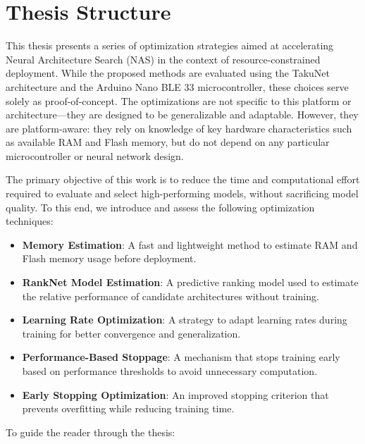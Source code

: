 \chapter{Thesis Structure}
\label{chap:ThesisStructure}


This thesis presents a series of optimization strategies aimed at accelerating Neural Architecture Search (NAS) in the context of resource-constrained deployment. While the proposed methods are evaluated using the TakuNet architecture and the Arduino Nano BLE 33 microcontroller, these choices serve solely as proof-of-concept. The optimizations are not specific to this platform or architecture—they are designed to be generalizable and adaptable. However, they are platform-aware: they rely on knowledge of key hardware characteristics such as available RAM and Flash memory, but do not depend on any particular microcontroller or neural network design.

The primary objective of this work is to reduce the time and computational effort required to evaluate and select high-performing models, without sacrificing model quality. To this end, we introduce and assess the following optimization techniques:


\begin{itemize}
    \item \textbf{Memory Estimation}: A fast and lightweight method to estimate RAM and Flash memory usage before deployment.
    \item \textbf{RankNet Model Estimation}: A predictive ranking model used to estimate the relative performance of candidate architectures without training.
    \item \textbf{Learning Rate Optimization}: A strategy to adapt learning rates during training for better convergence and generalization.
    \item \textbf{Performance-Based Stoppage}: A mechanism that stops training early based on performance thresholds to avoid unnecessary computation.
    \item \textbf{Early Stopping Optimization}: An improved stopping criterion that prevents overfitting while reducing training time.
\end{itemize}

To guide the reader through the thesis:

